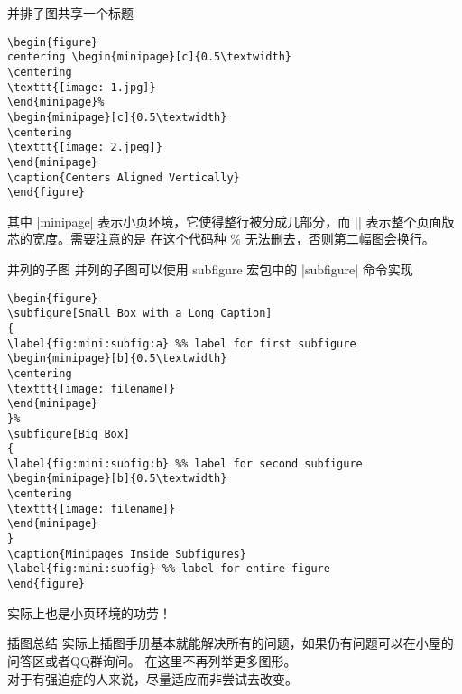 \begin{frame}[fragile]{并排子图共享一个标题}
\begin{lstlisting}
\begin{figure}
centering \begin{minipage}[c]{0.5\textwidth}
\centering
\texttt{[image: 1.jpg]}
\end{minipage}%
\begin{minipage}[c]{0.5\textwidth}
\centering
\texttt{[image: 2.jpeg]}
\end{minipage}
\caption{Centers Aligned Vertically}
\end{figure}
\end{lstlisting}
其中  |minipage| 表示小页环境，它使得整行被分成几部分，而 |\textwidth| 表示整个页面版芯的宽度。需要注意的是
在这个代码种 $\%$ 无法删去，否则第二幅图会换行。  
\end{frame}

\begin{frame}[fragile]{并列的子图}
并列的子图可以使用 subfigure 宏包中的 |subfigure| 命令实现
\begin{lstlisting}[basicstyle=\tiny]
\begin{figure}
\subfigure[Small Box with a Long Caption]
{
\label{fig:mini:subfig:a} %% label for first subfigure
\begin{minipage}[b]{0.5\textwidth}
\centering
\texttt{[image: filename]} 
\end{minipage}
}% 	
\subfigure[Big Box]
{
\label{fig:mini:subfig:b} %% label for second subfigure
\begin{minipage}[b]{0.5\textwidth}
\centering
\texttt{[image: filename]} 
\end{minipage}
}
\caption{Minipages Inside Subfigures}
\label{fig:mini:subfig} %% label for entire figure
\end{figure}
\end{lstlisting}
实际上也是小页环境的功劳！
\end{frame}

\begin{frame}[fragile]{插图总结}
\phantom{幻影}实际上插图手册基本就能解决所有的问题，如果仍有问题可以在小屋的问答区或者QQ群询问。
在这里不再列举更多图形。\\
\phantom{幻影} 对于有强迫症的人来说，尽量适应而非尝试去改变。
\end{frame}